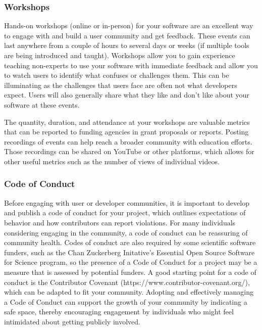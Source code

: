 \documentclass{article}
\begin{document}
\subsubsection{Workshops}
Hands-on workshops (online\cite{dillon_experiences_2021} or in-person) for your software are an excellent way to engage with and build a user community and get feedback. These events can last anywhere from a couple of hours to several days or weeks (if multiple tools are being introduced and taught). Workshops allow you to gain experience teaching non-experts to use your software with immediate feedback and allow you to watch users to identify what confuses or challenges them. This can be illuminating as the challenges that users face are often not what developers expect. Users will also generally share what they like and don’t like about your software at these events. 

The quantity, duration, and attendance at your workshops are valuable metrics that can be reported to funding agencies in grant proposals or reports. Posting recordings of events can help reach a broader community with education efforts. Those recordings can be shared on YouTube or other platforms, which allows for other useful metrics such as the number of views of individual videos. 

\subsubsection{Code of Conduct}
Before engaging with user or developer communities, it is important to develop and publish a code of conduct for your project, which outlines expectations of behavior and how contributors can report violations. For many individuals considering engaging in the community, a code of conduct can be reassuring of community health. Codes of conduct are also required by some scientific software funders, such as the Chan Zuckerberg Initative’s Essential Open Source Software for Science program, so the presence of a Code of Conduct for a project may be a measure that is assessed by potential funders. A good starting point for a code of conduct is the Contributor Covenant (https://www.contributor-covenant.org/), which can be adapted to fit your community. Adopting and effectively managing\cite{aurora_how_2019} a  Code of Conduct can support the growth of your community by indicating a safe space, thereby encouraging engagement by individuals who might feel intimidated about getting publicly involved.
\end{document}
